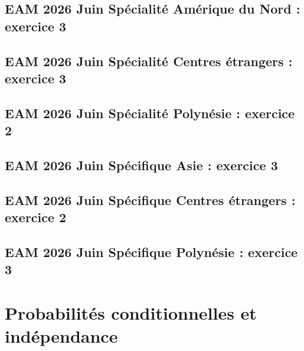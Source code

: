 \documentclass[lang=fr,edition=teacher,layout=sheet]{mxbook}
\begin{document}
\subsection*{EAM 2026 Juin Spécialité Amérique du Nord : exercice 3}
\begingroup\endgroup
\par\bigskip
{}\subsection*{EAM 2026 Juin Spécialité Centres étrangers : exercice 3}
\begingroup\endgroup
\par\bigskip
{}\subsection*{EAM 2026 Juin Spécialité Polynésie : exercice 2}
\begingroup\endgroup
\par\bigskip
{}\subsection*{EAM 2026 Juin Spécifique Asie : exercice 3}
\begingroup\endgroup
\par\bigskip
{}\subsection*{EAM 2026 Juin Spécifique Centres étrangers : exercice 2}
\begingroup\endgroup
\par\bigskip
{}\subsection*{EAM 2026 Juin Spécifique Polynésie : exercice 3}
\begingroup\endgroup
\par\bigskip
\clearpage\section*{Probabilités conditionnelles et indépendance}
\end{document}

